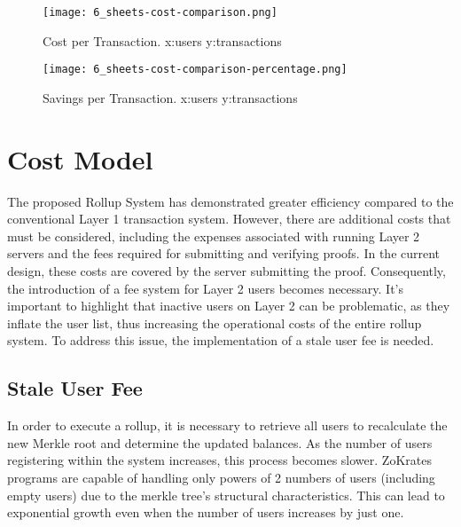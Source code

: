 \begin{figure}
	\centering
	\begin{minipage}{.5\textwidth}
		\centering
		\texttt{[image: 6\_sheets-cost-comparison.png]}
		\caption[Cost Comparison]{Cost per Transaction. \newline x:users y:transactions}
		\label{fig:6_sheets-cost-comparison}
	\end{minipage}%
	\begin{minipage}{.5\textwidth}
		\centering
		\texttt{[image: 6\_sheets-cost-comparison-percentage.png]}
		\caption[Transaction Savings]{Savings per Transaction. \newline x:users y:transactions}
		\label{fig:6_sheets-cost-comparison-percentage}
	\end{minipage}
\end{figure}

\section{Cost Model}

The proposed Rollup System has demonstrated greater efficiency compared to the conventional Layer 1 transaction system. However, there are additional costs that must be considered, including the expenses associated with running Layer 2 servers and the fees required for submitting and verifying proofs. In the current design, these costs are covered by the server submitting the proof. Consequently, the introduction of a fee system for Layer 2 users becomes necessary. It's important to highlight that inactive users on Layer 2 can be problematic, as they inflate the user list, thus increasing the operational costs of the entire rollup system. To address this issue, the implementation of a stale user fee is needed.

\subsection{Stale User Fee\label{subsec:7_staleuserfee}}

In order to execute a rollup, it is necessary to retrieve all users to recalculate the new Merkle root and determine the updated balances. As the number of users registering within the system increases, this process becomes slower. ZoKrates programs are capable of handling only powers of 2 numbers of users (including empty users) due to the merkle tree's structural characteristics. This can lead to exponential growth even when the number of users increases by just one.

